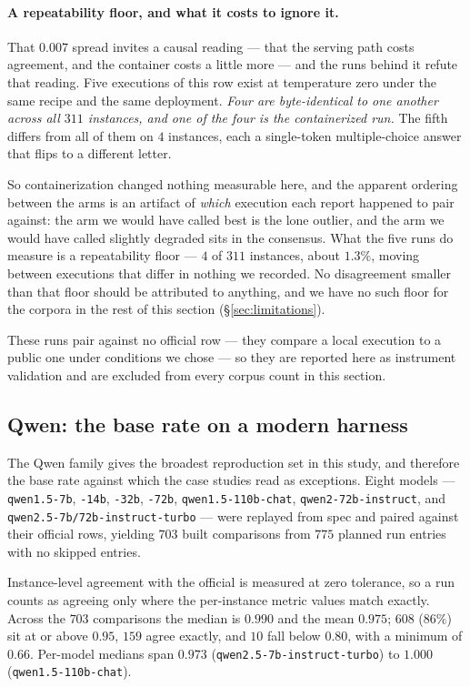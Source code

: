 \paragraph{A repeatability floor, and what it costs to ignore it.} That $0.007$
spread invites a causal reading --- that the serving path costs agreement, and the
container costs a little more --- and the runs behind it refute that reading. Five
executions of this row exist at temperature zero under the same recipe and the
same deployment. \emph{Four are byte-identical to one another across all $311$
instances, and one of the four is the containerized run.} The fifth differs from
all of them on $4$ instances, each a single-token multiple-choice answer that
flips to a different letter.

So containerization changed nothing measurable here, and the apparent ordering
between the arms is an artifact of \emph{which} execution each report happened to
pair against: the arm we would have called best is the lone outlier, and the arm
we would have called slightly degraded sits in the consensus. What the five runs
do measure is a repeatability floor --- $4$ of $311$ instances, about $1.3\%$,
moving between executions that differ in nothing we recorded. No disagreement
smaller than that floor should be attributed to anything, and we have no such
floor for the corpora in the rest of this section (\S\ref{sec:limitations}).

These runs pair against no official row --- they compare a local execution to a
public one under conditions we chose --- so they are reported here as instrument
validation and are excluded from every corpus count in this section.

\subsection{Qwen: the base rate on a modern harness}
\label{sec:qwen}

The Qwen family gives the broadest reproduction set in this study, and therefore
the base rate against which the case studies read as exceptions. Eight
models --- \texttt{qwen1.5-7b}, \texttt{-14b}, \texttt{-32b}, \texttt{-72b},
\texttt{qwen1.5-110b-chat}, \texttt{qwen2-72b-instruct},
and \texttt{qwen2.5-7b/72b-instruct-turbo} --- were replayed from spec and paired
against their official rows, yielding $703$ built comparisons from $775$ planned
run entries with no skipped entries.

Instance-level agreement with the official is measured at zero tolerance, so a
run counts as agreeing only where the per-instance metric values match exactly.
Across the $703$ comparisons the median is $0.990$ and the mean $0.975$;
$608$ ($86\%$) sit at or above $0.95$, $159$ agree exactly, and $10$ fall
below $0.80$, with a minimum of $0.66$. Per-model medians span $0.973$
(\texttt{qwen2.5-7b-instruct-turbo}) to $1.000$ (\texttt{qwen1.5-110b-chat}).

